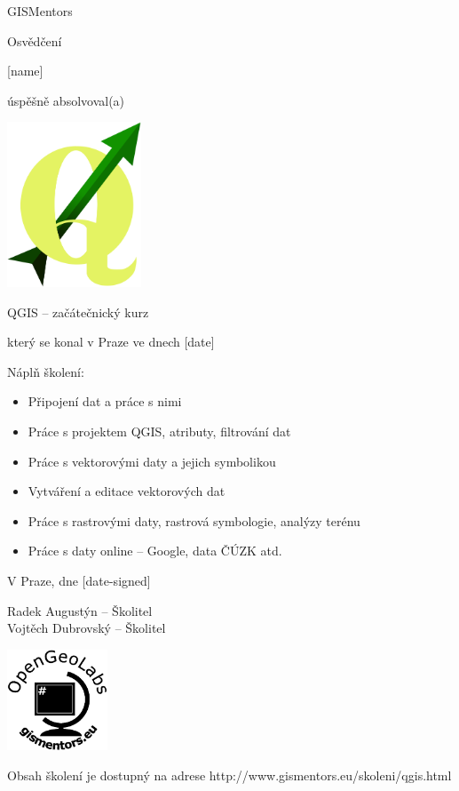 \documentclass[12pt, a4paper]{letter}
\begin{document}
\pagestyle{empty}
\begin{center}

{\Large GISMentors}

{\Huge Osvědčení}

{\Large [name]}

úspěšně absolvoval(a)

\includegraphics[width=0.30\textwidth]{../images/qgislogo_vector.eps}

{\Large QGIS -- začátečnický kurz}

který se konal v Praze ve dnech [date]
\end{center}

Náplň školení:

\begin{itemize}
    \item Připojení dat a práce s nimi
    \item Práce s projektem QGIS, atributy, filtrování dat
    \item Práce s vektorovými daty a jejich symbolikou
    \item Vytváření a editace vektorových dat
    \item Práce s rastrovými daty, rastrová symbologie, analýzy terénu
    \item Práce s daty online -- Google, data ČÚZK atd.
\end{itemize}

\vfill
\parbox{7cm}{

    V Praze, dne [date-signed]\\

\vfill

    Radek Augustýn -- Školitel\\

\vfill
    Vojtěch Dubrovský -- Školitel
}
\hfill
\parbox{3cm}{
    \includegraphics[width=3cm]{../images/placka.eps}
}


\begin{center}
{\footnotesize Obsah školení je dostupný na adrese
http://www.gismentors.eu/skoleni/qgis.html}
\end{center}
\end{document}
